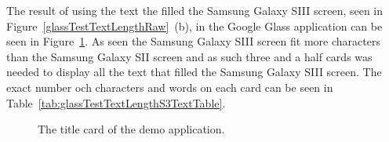 The result of using the text the filled the Samsung Galaxy SIII screen, seen in Figure~\ref{glassTestTextLengthRaw}~(b), in the Google Glass application can be seen in Figure~\ref{glassTestTextLengthS3Text}. As seen the Samsung Galaxy SIII screen fit more characters than the Samsung Galaxy SII screen and as such three and a half cards was needed to display all the text that filled the Samsung Galaxy SIII screen. The exact number och characters and words on each card can be seen in Table~\ref{tab:glassTestTextLengthS3TextTable}.

	\begin{figure}[H]%
		\centering
   		 \qquad
   		 \qquad
   		 \qquad
   		 \qquad
		\caption{The title card of the demo application.}
		\label{glassTestTextLengthS3Text}
	\end{figure}

